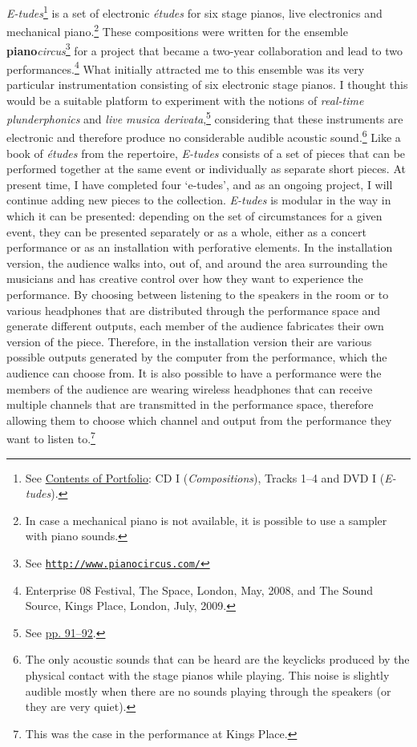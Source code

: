 \emph{E-tudes}\footnote{See \hyperlink{portfolio}{Contents of Portfolio}: CD I (\emph{Compositions}), Tracks 1--4 and DVD I (\emph{E-tudes}).} is a set of electronic \emph{\'{e}tudes} for six stage pianos, live electronics and mechanical piano.\footnote{In case a mechanical piano is not available, it is possible to use a sampler with piano sounds.} These compositions were written for the ensemble \textbf{piano}\emph{circus}\footnote{See \href{http://www.pianocircus.com/}{\texttt{http://www.pianocircus.com/}}} for a project that became a \mbox{two-year} collaboration and lead to two performances.\footnote{Enterprise 08 Festival, The Space, London, May, 2008, and The Sound Source, Kings Place, London, July, 2009.} What initially attracted me to this ensemble was its very particular instrumentation consisting of six electronic stage pianos. I thought this would be a suitable platform to experiment with the notions of \emph{real-time plunderphonics} and \emph{live musica derivata},\footnote{See \hyperlink{realtimeplunderfuck}{pp. 91--92}.} considering that these instruments are electronic and therefore produce no considerable audible acoustic sound.\footnote{The only acoustic sounds that can be heard are the keyclicks produced by the physical contact with the stage pianos while playing. This noise is slightly audible mostly when there are no sounds playing through the speakers (or they are very quiet).} Like a book of \emph{\'{e}tudes} from the repertoire, \emph{E-tudes} consists of a set of pieces that can be performed together at the same event or individually as separate short pieces. At present time, I have completed four `e-tudes', and as an ongoing project, I will continue adding new pieces to the collection. \emph{E-tudes} is modular in the way in which it can be presented: depending on the set of circumstances for a given event, they can be presented separately or as a whole, either as a concert performance or as an installation with perforative elements. In the installation version, the audience walks into, out of, and around the area surrounding the musicians and has creative control over how they want to experience the performance. By choosing between listening to the speakers in the room or to various headphones that are distributed through the performance space and generate different outputs, each member of the audience fabricates their own version of the piece. Therefore, in the installation version their are various possible outputs generated by the computer from the performance, which the audience can choose from. It is also possible to have a performance were the members of the audience are wearing wireless headphones that can receive multiple channels that are transmitted in the performance space, therefore allowing them to choose which channel and output from the performance they want to listen to.\footnote{This was the case in the performance at Kings Place.}

